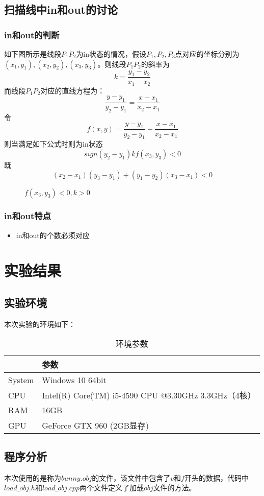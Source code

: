 \documentclass[10pt]{article}
\begin{document}
\subsection{扫描线中in和out的讨论}
\subsubsection{in和out的判断}
如下图所示是线段$P_1P_2$为in状态的情况，假设$P_1,P_2,P_3$点对应的坐标分别为$(x_1,y_1),(x_2,y_2),(x_3,y_3)$。则线段$P_1P_2$的斜率为$$k=\frac{y_1-y_2}{x_1-x_2}$$
而线段$P_1P_2$对应的直线方程为：
$$\frac{y-y_1}{y_2-y_1}=\frac{x-x_1}{x_2-x_1}$$
令
$$f(x,y)=\frac{y-y_1}{y_2-y_1}-\frac{x-x_1}{x_2-x_1}$$
则当满足如下公式时则为in状态
$$sign(y_2-y_1)kf(x_3,y_3)<0$$
既
$$(x_2-x_1)(y_3-y_1)+(y_1-y_2)(x_3-x_1)<0$$
\begin{figure}[H]
\begin{center}
\begin{minipage}[t]{0.45\linewidth}
\caption{$f(x_3,y_3)>0,k<0$}
\end{minipage}
\begin{minipage}[t]{0.45\linewidth}
\caption{$f(x_3,y_3)<0,k>0$}
\end{minipage}
\end{center}
\end{figure}

\subsubsection{in和out特点}
\begin{itemize}
\item{in和out的个数必须对应}
\end{itemize}

\section{实验结果}
\subsection{实验环境}
本次实验的环境如下：
\begin{table}[H]
\caption{环境参数}
\begin{center}
\begin{tabular}{ll}
\toprule  %
& 参数\\
\midrule  %
System& Windows 10 64bit \\
CPU& Intel(R) Core(TM) i5-4590 CPU @3.30GHz 3.3GHz（4核）\\
RAM& 16GB\\
GPU& GeForce GTX 960 (2GB显存)\\
\bottomrule %
\end{tabular}
\end{center}
\end{table}
\subsection{程序分析}
本次使用的是称为$bunny.obj$的文件，该文件中包含了$v$和$f$开头的数据，代码中$load\_obj.h$和$load\_obj.cpp$两个文件定义了加载$obj$文件的方法。
\end{document}
